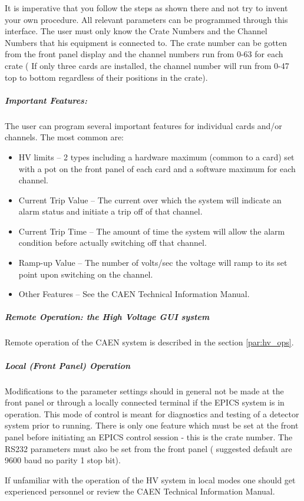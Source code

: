 It is imperative that
you follow the steps as shown there and not try to invent your own
procedure.
All relevant parameters
can be programmed through this interface.  The user must only know the
Crate Numbers and the Channel Numbers that his equipment is connected
to.  The crate number can be gotten from the front panel display and the
channel numbers run from 0-63 for each crate ( If only three cards are
installed, the channel number will run from 0-47 top to bottom
regardless of their positions in the crate).

\subparagraph{Important Features:}

The user can program several important features for individual
cards and/or channels.  The most common are:

\begin{itemize}
\item{HV limits -- 2 types including a hardware maximum (common to a
card) set with a pot on the front panel of each card and a software
maximum for each channel.}
\item{Current Trip Value -- The current over which the system will
indicate an alarm status and initiate a trip off of that channel.}
\item{Current Trip Time -- The amount of time the system will allow
the alarm condition before actually switching off that channel.}
\item{Ramp-up Value -- The number of volts/sec the voltage will ramp
to its set point upon switching on the channel.}
\item{Other Features -- See the CAEN Technical Information Manual.}
\end{itemize}

\subparagraph{Remote Operation: the High Voltage GUI system}
Remote operation of the CAEN system is described in the section
\ref{par:hv_ops}.

\subparagraph{Local (Front Panel) Operation}

Modifications to the parameter settings should in general not be
made at the front panel or through a locally connected terminal if the
EPICS system is in operation.  This mode of control is meant for
diagnostics and testing of a detector system prior to running.  There is
only one feature which must be set at the front panel before initiating
an EPICS control session - this is the crate number.  The RS232
parameters must also be set from the front panel ( suggested default are
9600 baud  no parity  1 stop bit).

If unfamiliar with the operation of the HV system in local modes
one should get experienced personnel or review the CAEN Technical
Information Manual.


